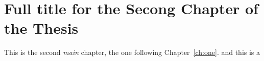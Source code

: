 \chapter[Second Chapter]%
{Full title for the Secong Chapter of the Thesis}
\label{ch:two}

This is the second \emph{main} chapter, the one following
Chapter~\ref{ch:one}. and this is a %


